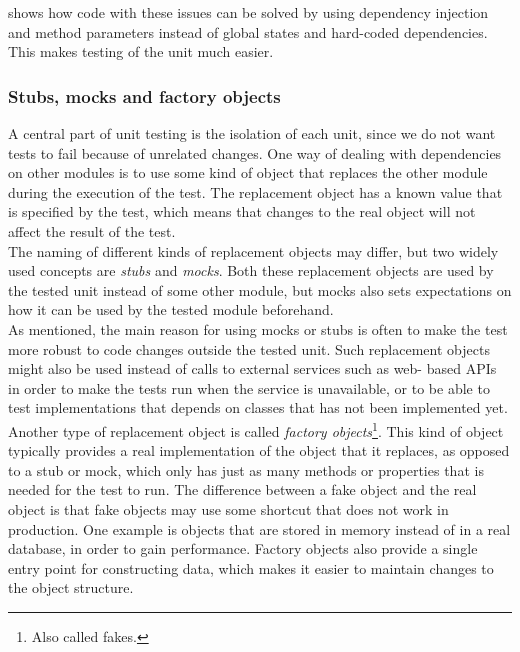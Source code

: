 \citeauthor{video:misko_psychology} shows how code with these issues can
be solved by using dependency injection and method parameters instead
of global states and hard-coded dependencies. This makes testing of the
unit much easier.\\


\subsubsection{Stubs, mocks and factory objects}
\label{sec:theory_mocks}

A central part of unit testing is the isolation of each unit, since we
do not want tests to fail because of unrelated changes. One way of
dealing with dependencies on other modules is to use some kind of object
that replaces the other module during the execution of the test. The
replacement object has a known value that is specified by the test,
which means that changes to the real object will not affect the result
of the test.\\

The naming of different kinds of replacement objects may differ, but two
widely used concepts are \emph{stubs} and \emph{mocks}. Both these
replacement objects are used by the tested unit instead of some other
module, but mocks also sets expectations on how it can be used by the
tested module beforehand. \cite{web:mocks_arent_stubs}\\

As mentioned, the main reason for using mocks or stubs is often to make
the test more robust to code changes outside the tested unit. Such
replacement objects might also be used instead of calls to external
services such as web- based APIs in order to make the tests run when the
service is unavailable, or to be able to test implementations that
depends on classes that has not been implemented yet.\\

Another type of replacement object is called \emph{factory
objects}\footnote{Also called fakes.}. This kind of object typically
provides a real implementation of the object that it replaces, as
opposed to a stub or mock, which only has just as many methods or
properties that is needed for the test to run. The difference between a
fake object and the real object is that fake objects may use some
shortcut that does not work in production. One example is objects that
are stored in memory instead of in a real database, in order to gain
performance. Factory objects also provide a single entry point for
constructing data, which makes it easier to maintain changes to the
object structure. \cite{web:mocks_arent_stubs}\\

